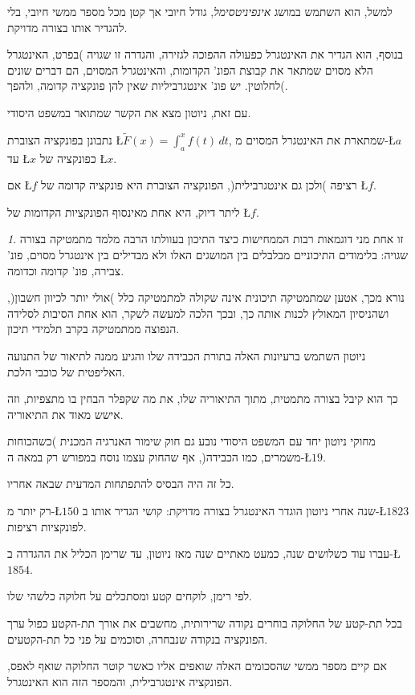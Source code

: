 \documentclass[english,hebrew]{article}
\theoremstyle{remark}
\newtheorem*{rem*}{\protect\remarkname}
\theoremstyle{definition}
\theoremstyle{plain}
\theoremstyle{remark}
\theoremstyle{plain}
\theoremstyle{plain}
\providecommand{\remarkname}{הערה}
\begin{document}
למשל, הוא השתמש במושג \emph{אינפיניטסימל}, גודל חיובי אך קטן מכל
מספר ממשי חיובי, בלי להגדיר אותו בצורה מדויקת.

בנוסף, הוא הגדיר את האינטגרל כפעולה ההפוכה לגזירה, והגדרה זו שגויה
)בפרט, האינטגרל הלא מסוים שמתאר את קבוצת הפונ' הקדומות, והאינטגרל
המסוים, הם דברים שונים לחלוטין. יש פונ' אינטגרביליות שאין להן פונקציה
קדומה, ולהפך(.

עם זאת, ניוטון מצא את הקשר שמתואר במשפט היסודי.

נתבונן בפונקציה הצוברת \L{$\tilde{F}(x)=\int_{a}^{x}f(t)\,dt$}, שמתארת
את האינטגרל המסוים מ-\L{$a$} עד \L{$x$} כפונקציה של \L{$x$}. 

אם \L{$f$} רציפה )ולכן גם אינטגרבילית(, הפונקציה הצוברת היא פונקציה
קדומה של \L{$f$}.

ליתר דיוק, היא אחת מאינסוף הפונקציות הקדומות של \L{$f$}.
\begin{rem*}
זו אחת מני דוגמאות רבות הממחישות כיצד התיכון בעוולתו הרבה מלמד מתמטיקה
בצורה שגויה: בלימודים התיכוניים מבלבלים בין המושגים האלו ולא מבדילים
בין אינטגרל מסוים, פונ' צבירה, פונ' קדומה וכדומה.

נורא מכך, אטען שמתמטיקה תיכונית אינה שקולה למתמטיקה כלל )אולי יותר
לכיוון חשבון(, ושהניסיון המאולץ לכנות אותה כך, ובכך הלכה למעשה לשקר, הוא
אחת הסיבות לסלידה הנפוצה ממתמטיקה בקרב תלמידי תיכון.
\end{rem*}
ניוטון השתמש ברעיונות האלה בתורת הכבידה שלו והגיע ממנה לתיאור של התנועה
האליפטית של כוכבי הלכת.

כך הוא קיבל בצורה מתמטית, מתוך התיאוריה שלו, את מה שקפלר הבחין בו
מתצפיות, וזה אישש מאוד את התיאוריה.

מחוקי ניוטון יחד עם המשפט היסודי נובע גם חוק שימור האנרגיה המכנית )כשהכוחות משמרים, כמו הכבידה(,
אף שהחוק עצמו נוסח במפורש רק במאה ה-\L{$19$}.

כל זה היה הבסיס להתפתחות המדעית שבאה אחריו.

רק יותר מ-\L{$150$} שנה אחרי ניוטון הוגדר האינטגרל בצורה מדויקת:
קושי הגדיר אותו ב-\L{$1823$} לפונקציות רציפות.

עברו עוד כשלושים שנה, כמעט מאתיים שנה מאז ניוטון, עד שרימן הכליל את
ההגדרה ב-\L{$1854$}.

לפי רימן, לוקחים קטע ומסתכלים על חלוקה כלשהי שלו.

בכל תת-קטע של החלוקה בוחרים נקודה שרירותית, מחשבים את אורך תת-הקטע
כפול ערך הפונקציה בנקודה שנבחרה, וסוכמים על פני כל תת-הקטעים. 

אם קיים מספר ממשי שהסכומים האלה שואפים אליו כאשר קוטר החלוקה שואף
לאפס, הפונקציה אינטגרבילית, והמספר הזה הוא האינטגרל.
\end{document}
